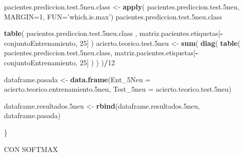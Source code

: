 \documentclass[]{article}
\newenvironment{Shaded}{\begin{snugshade}}{\end{snugshade}}
\newcommand{\KeywordTok}[1]{\textcolor[rgb]{0.13,0.29,0.53}{\textbf{#1}}}
\newcommand{\DataTypeTok}[1]{\textcolor[rgb]{0.13,0.29,0.53}{#1}}
\newcommand{\DecValTok}[1]{\textcolor[rgb]{0.00,0.00,0.81}{#1}}
\newcommand{\StringTok}[1]{\textcolor[rgb]{0.31,0.60,0.02}{#1}}
\newcommand{\OperatorTok}[1]{\textcolor[rgb]{0.81,0.36,0.00}{\textbf{#1}}}
\newcommand{\NormalTok}[1]{#1}
\begin{document}
\begin{Shaded}
\begin{Highlighting}[]
\NormalTok{  pacientes.prediccion.test.5neu.class <-}\StringTok{ }\KeywordTok{apply}\NormalTok{( pacientes.prediccion.test.5neu, }\DataTypeTok{MARGIN=}\DecValTok{1}\NormalTok{, }\DataTypeTok{FUN=}\StringTok{'which.is.max'}\NormalTok{)}
\NormalTok{  pacientes.prediccion.test.5neu.class}
  
  \KeywordTok{table}\NormalTok{( pacientes.prediccion.test.5neu.class , matriz.pacientes.etiquetas[}\OperatorTok{-}\NormalTok{conjuntoEntrenamiento, }\DecValTok{25}\NormalTok{] )}
\NormalTok{  acierto.teorico.test.5neu <-}\StringTok{ }\KeywordTok{sum}\NormalTok{( }\KeywordTok{diag}\NormalTok{( }\KeywordTok{table}\NormalTok{( pacientes.prediccion.test.5neu.class, matriz.pacientes.etiquetas[}\OperatorTok{-}\NormalTok{conjuntoEntrenamiento, }\DecValTok{25}\NormalTok{] ) ) )}\OperatorTok{/}\DecValTok{12}
  
  
\NormalTok{  dataframe.pasada <-}\StringTok{ }\KeywordTok{data.frame}\NormalTok{(}\DataTypeTok{Ent_5Neu =}\NormalTok{ acierto.teorico.entrenamiento.5neu,}
                                 \DataTypeTok{Test_5neu =}\NormalTok{ acierto.teorico.test.5neu)}
  
\NormalTok{  dataframe.resultados.5neu <-}\StringTok{ }\KeywordTok{rbind}\NormalTok{(dataframe.resultados.5neu, dataframe.pasada)}
  
\NormalTok{\}}
\end{Highlighting}
\end{Shaded}

CON SOFTMAX
\end{document}
